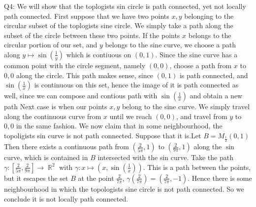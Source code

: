 \documentclass[letterpaper]{article}
\DeclareMathOperator{\R}{\mathbb{R}}
\begin{document}
\noindent Q4: We will show that the toplogists sin circle is path connected, yet not locally path connected. First suppose that we have two points $x,y$ belonging to the circular subset of the toplogists sine circle. 
We simply take a path along the subset of the circle between these two points. If the points $x$ belongs to the circular portion of our set, and $y$ belongs to the sine curve, we choose a path along $y\mapsto \sin(\frac{1}{y}) $ which is contiuous on $(0,1)$. Since the sine curve has a common point with the circle segment, namely $(0,0)$, choose a path from $x$ to $0,0$ along the circle. 
This path makes sense, since $(0,1)$ is path connected, and $\sin(\frac{1}{x})$ is continuous on this set, hence the image of it is path connected as well, since we can compose and contious path with $\sin(\frac{1}{x})$ and obtain a new path
Next case is when our points $x,y$ belong to the sine curve. We simply travel along the continuous curve from $x$ until we reach $(0,0)$, and travel from $y$ to $0,0$ in the same fashion. We now claim that in some neighbourhood, the topoligists sin curve is not path connected. 
Suppose that it is.Let $B=M_{\frac{1}{2}}(0,1)$ Then there exists a continuous path from $(\frac{2}{5\pi},1)$ to $(\frac{2}{9\pi},1)$ along the $\sin$ curve, which is contained in $B$ intersected with the sin curve. Take the path $\gamma:[\frac{2}{5\pi},\frac{2}{9\pi}] \rightarrow \R^2$ with $\gamma: x\mapsto (x,\sin(\frac{1}{x}))$. This is a path between the points, but it escapes the set $B$ at the point $\frac{2}{7\pi}$, $\gamma(\frac{2}{7\pi}) = (\frac{2}{7\pi},-1)$. Hence there is some neighbourhood in which the topologists sine circle is not path connected. So we conclude it is not locally path connected. 
\end{document}
